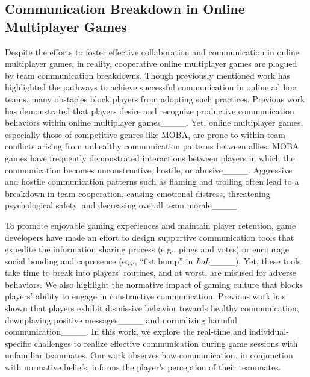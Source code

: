 \subsection{Communication Breakdown in Online Multiplayer Games}

Despite the efforts to foster effective collaboration and communication in online multiplayer games, in reality, cooperative online multiplayer games are plagued by team communication breakdowns. Though previously mentioned work has highlighted the pathways to achieve successful communication in online ad hoc teams, many obstacles block players from adopting such practices. Previous work has demonstrated that players desire and recognize productive communication behaviors within online multiplayer games____. Yet, online multiplayer games, especially those of competitive genres like MOBA, are prone to within-team conflicts arising from unhealthy communication patterns between allies. MOBA games have frequently demonstrated interactions between players in which the communication becomes unconstructive, hostile, or abusive____. Aggressive and hostile communication patterns such as flaming and trolling often lead to a breakdown in team cooperation, causing emotional distress, threatening psychological safety, and decreasing overall team morale____.

To promote enjoyable gaming experiences and maintain player retention, game developers have made an effort to design supportive communication tools that expedite the information sharing process (e.g., pings and votes) or encourage social bonding and copresence (e.g., ``fist bump'' in \textit{LoL}____). Yet, these tools take time to break into players' routines, and at worst, are misused for adverse behaviors. We also highlight the normative impact of gaming culture that blocks players' ability to engage in constructive communication. Previous work has shown that players exhibit dismissive behavior towards healthy communication, downplaying positive messages____ and normalizing harmful communication____. In this work, we explore the real-time and individual-specific challenges to realize effective communication during game sessions with unfamiliar teammates. Our work observes how communication, in conjunction with normative beliefs, informs the player's perception of their teammates.